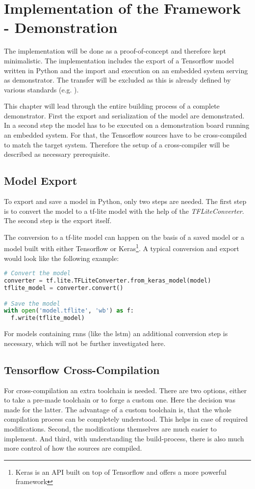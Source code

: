 \chapter{Implementation of the Framework - Demonstration}
The implementation will be done as a proof-of-concept and therefore kept minimalistic. The implementation includes the export of a Tensorflow model written in Python and the import and execution on an embedded system serving as demonstrator. The transfer will be excluded as this is already defined by various standards (e.g. \cite{spp}). 

This chapter will lead through the entire building process of a complete demonstrator. \newline
First the export and serialization of the model are demonstrated. In a second step the model has to be executed on a demonstration board running an embedded system. For that, the Tensorflow sources have to be cross-compiled to match the target system. Therefore the setup of a cross-compiler will be described as necessary prerequisite.

\section{Model Export}
To export and save a model in Python, only two steps are needed. The first step is to convert the model to a tf-lite model with the help of the \textit{TFLiteConverter}. The second step is the export itself.

The conversion to a tf-lite model can happen on the basis of a saved model or a model built with either Tensorflow or Keras\footnote{Keras is an API built on top of Tensorflow and offers a more powerful framework}\cite{keras}. A typical conversion and export would look like the following example:

\newpage
\begin{lstlisting}[caption={model export}, language=python]
# Convert the model
converter = tf.lite.TFLiteConverter.from_keras_model(model)
tflite_model = converter.convert()

# Save the model
with open('model.tflite', 'wb') as f:
  f.write(tflite_model)
\end{lstlisting}

For models containing \acp{rnn} (like the \ac{lstm}) an additional conversion step is necessary, which will not be further investigated here.

\section{Tensorflow Cross-Compilation}
For cross-compilation an extra toolchain is needed. There are two options, either to take a pre-made toolchain or to forge a custom one. Here the decision was made for the latter. \newline
The advantage of a custom toolchain is, that the whole compilation process can be completely understood. This helps in case of required modifications. Second, the modifications themselves are much easier to implement. And third, with understanding the build-process, there is also much more control of how the sources are compiled.

